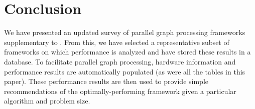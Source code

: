 \documentclass[conference]{IEEEtran}
\begin{document}
\section{Conclusion} %
We have presented an updated survey of parallel graph processing frameworks supplementary to \cite{Doekemeijer:2015:GPFSurvey}. From this, we have selected a representative subset of frameworks on which performance is analyzed and have stored these results in a database. To facilitate parallel graph processing, hardware information and performance results are automatically populated (as were all the tables in this paper). These performance results are then used to provide simple recommendations of the optimally-performing framework given a particular algorithm and problem size.

%


\end{document}
